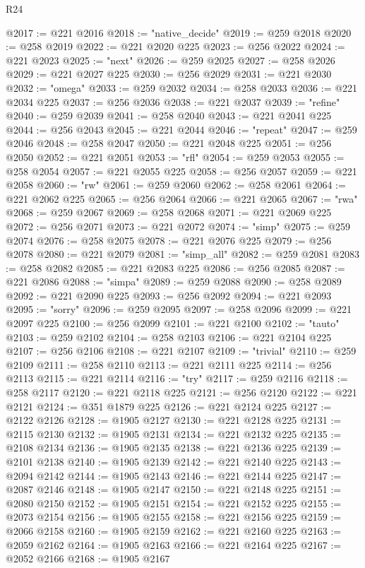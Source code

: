 \begin{lexlean}{R24}
\begin{coremodule}
@2017 := @221 @2016
@2018 := "native_decide"
@2019 := @259 @2018
@2020 := @258 @2019
@2022 := @221 @2020 @225
@2023 := @256 @2022
@2024 := @221 @2023
@2025 := "next"
@2026 := @259 @2025
@2027 := @258 @2026
@2029 := @221 @2027 @225
@2030 := @256 @2029
@2031 := @221 @2030
@2032 := "omega"
@2033 := @259 @2032
@2034 := @258 @2033
@2036 := @221 @2034 @225
@2037 := @256 @2036
@2038 := @221 @2037
@2039 := "refine"
@2040 := @259 @2039
@2041 := @258 @2040
@2043 := @221 @2041 @225
@2044 := @256 @2043
@2045 := @221 @2044
@2046 := "repeat"
@2047 := @259 @2046
@2048 := @258 @2047
@2050 := @221 @2048 @225
@2051 := @256 @2050
@2052 := @221 @2051
@2053 := "rfl"
@2054 := @259 @2053
@2055 := @258 @2054
@2057 := @221 @2055 @225
@2058 := @256 @2057
@2059 := @221 @2058
@2060 := "rw"
@2061 := @259 @2060
@2062 := @258 @2061
@2064 := @221 @2062 @225
@2065 := @256 @2064
@2066 := @221 @2065
@2067 := "rwa"
@2068 := @259 @2067
@2069 := @258 @2068
@2071 := @221 @2069 @225
@2072 := @256 @2071
@2073 := @221 @2072
@2074 := "simp"
@2075 := @259 @2074
@2076 := @258 @2075
@2078 := @221 @2076 @225
@2079 := @256 @2078
@2080 := @221 @2079
@2081 := "simp_all"
@2082 := @259 @2081
@2083 := @258 @2082
@2085 := @221 @2083 @225
@2086 := @256 @2085
@2087 := @221 @2086
@2088 := "simpa"
@2089 := @259 @2088
@2090 := @258 @2089
@2092 := @221 @2090 @225
@2093 := @256 @2092
@2094 := @221 @2093
@2095 := "sorry"
@2096 := @259 @2095
@2097 := @258 @2096
@2099 := @221 @2097 @225
@2100 := @256 @2099
@2101 := @221 @2100
@2102 := "tauto"
@2103 := @259 @2102
@2104 := @258 @2103
@2106 := @221 @2104 @225
@2107 := @256 @2106
@2108 := @221 @2107
@2109 := "trivial"
@2110 := @259 @2109
@2111 := @258 @2110
@2113 := @221 @2111 @225
@2114 := @256 @2113
@2115 := @221 @2114
@2116 := "try"
@2117 := @259 @2116
@2118 := @258 @2117
@2120 := @221 @2118 @225
@2121 := @256 @2120
@2122 := @221 @2121
@2124 := @351 @1879 @225
@2126 := @221 @2124 @225
@2127 := @2122 @2126
@2128 := @1905 @2127
@2130 := @221 @2128 @225
@2131 := @2115 @2130
@2132 := @1905 @2131
@2134 := @221 @2132 @225
@2135 := @2108 @2134
@2136 := @1905 @2135
@2138 := @221 @2136 @225
@2139 := @2101 @2138
@2140 := @1905 @2139
@2142 := @221 @2140 @225
@2143 := @2094 @2142
@2144 := @1905 @2143
@2146 := @221 @2144 @225
@2147 := @2087 @2146
@2148 := @1905 @2147
@2150 := @221 @2148 @225
@2151 := @2080 @2150
@2152 := @1905 @2151
@2154 := @221 @2152 @225
@2155 := @2073 @2154
@2156 := @1905 @2155
@2158 := @221 @2156 @225
@2159 := @2066 @2158
@2160 := @1905 @2159
@2162 := @221 @2160 @225
@2163 := @2059 @2162
@2164 := @1905 @2163
@2166 := @221 @2164 @225
@2167 := @2052 @2166
@2168 := @1905 @2167

\end{coremodule}
\end{lexlean}
